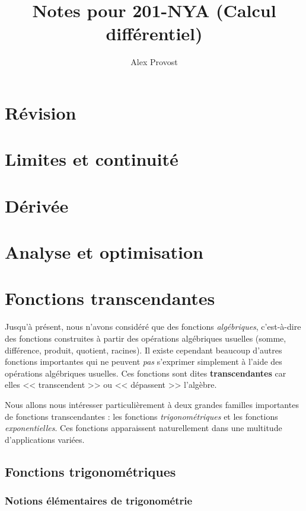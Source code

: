 \documentclass[12pt]{article}
\theoremstyle{definition}
\theoremstyle{remark}
\begin{document}
\title{Notes pour 201-NYA (Calcul différentiel)}
\author{Alex Provost}
\maketitle

\section{Révision}
\section{Limites et continuité}
\section{Dérivée}
\section{Analyse et optimisation}
\section{Fonctions transcendantes}

Jusqu'à présent, nous n'avons considéré que des fonctions \emph{algébriques}, c'est-à-dire des fonctions construites à partir des opérations algébriques usuelles (somme, différence, produit, quotient, racines).
Il existe cependant beaucoup d'autres fonctions importantes qui ne peuvent \emph{pas} s'exprimer simplement à l'aide des opérations algébriques usuelles. Ces fonctions sont dites \textbf{transcendantes} car elles << transcendent >> ou << dépassent >> l'algèbre.

Nous allons nous intéresser particulièrement à deux grandes familles importantes de fonctions transcendantes : les fonctions \emph{trigonométriques} et les fonctions \emph{exponentielles}. Ces fonctions apparaissent naturellement dans une multitude d'applications variées.

\subsection{Fonctions trigonométriques}

\subsubsection{Notions élémentaires de trigonométrie}
\end{document}
